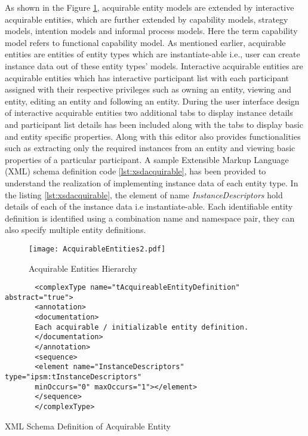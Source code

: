 As shown in the Figure \ref{fig:acquirableentities2}, acquirable entity models are extended by interactive acquirable entities, which are further extended by capability models, strategy models, intention models and informal process models. Here the term capability model refers to functional capability model. As mentioned earlier, acquirable entities are entities of entity types which are instantiate-able i.e., user can create instance data out of these entity types' models. Interactive acquirable entities are acquirable entities which has interactive participant list with each participant assigned with their respective privileges such as owning an entity, viewing and entity, editing an entity and following an entity. During the user interface design of interactive acquirable entities two additional tabs to display instance details and participant list details has been included along with the tabs to display basic and entity specific properties. Along with this editor also provides functionalities such as extracting only the required instances from an entity and viewing basic properties of a particular participant. A sample Extensible Markup Language (XML) schema definition code \ref{lst:xsdacquirable}, has been provided to understand the realization of implementing instance data of each entity type. In the listing \ref{lst:xsdacquirable}, the element of name \textit{InstanceDescriptors} hold details of each of the instance data i.e instantiate-able. Each identifiable entity definition is identified
using a combination name and namespace pair, they can also specify multiple entity definitions. 

\begin{figure}
	\centering
	\texttt{[image: AcquirableEntities2.pdf]}
	\caption{Acquirable Entities Hierarchy}
	\label{fig:acquirableentities2}
\end{figure}

\begin{Listing}
	\begin{lstlisting}
	   <complexType name="tAcquireableEntityDefinition" abstract="true">
	   <annotation>
	   <documentation>
	   Each acquirable / initializable entity definition.
	   </documentation>
	   </annotation>
	   <sequence>
	   <element name="InstanceDescriptors" type="ipsm:tInstanceDescriptors"
	   minOccurs="0" maxOccurs="1"></element>
	   </sequence>
	   </complexType>
		\end{lstlisting}
		\caption{XML Schema Definition of Acquirable Entity}
		\label{lst:xsdacquirable}
\end{Listing}

